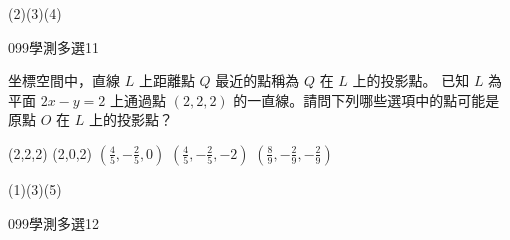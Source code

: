 \begin{QUESTIONS}
\begin{QUESTION}
\begin{QFROMS}
        \end{QFROMS}
        \begin{QTAGS}\end{QTAGS}
        \begin{QANS}
            (2)(3)(4)
        \end{QANS}
        \begin{QSOLLIST}
        \end{QSOLLIST}
        \begin{QEMPTYSPACE}
        \end{QEMPTYSPACE}
    \end{QUESTION}
    \begin{QUESTION}
        \begin{ExamInfo}{099}{學測}{多選}{11}
        \end{ExamInfo}
        \begin{ExamAnsRateInfo}{17}{25}{16}{10}
        \end{ExamAnsRateInfo}
        \begin{QBODY}
			坐標空間中，直線 $L$ 上距離點 $Q$ 最近的點稱為 $Q$ 在 $L$ 上的投影點。 已知 $L$ 為平面 $2x-y=2$ 上通過點 $(2, 2, 2)$ 的一直線。請問下列哪些選項中的點可能是原點 $O$ 在 $L$ 上的投影點？ 
			\begin{QOPS} 
				\QOP (2,2,2) 
				\QOP (2,0,2) 
				\QOP $(\frac{4}{5},-\frac{2}{5},0)$ 
				\QOP $(\frac{4}{5},-\frac{2}{5},-2)$ 
				\QOP $(\frac{8}{9},-\frac{2}{9},-\frac{2}{9})$
			\end{QOPS}
        \end{QBODY}
        \begin{QFROMS}
        \end{QFROMS}
        \begin{QTAGS}\end{QTAGS}
        \begin{QANS}
            (1)(3)(5)
        \end{QANS}
        \begin{QSOLLIST}
        \end{QSOLLIST}
        \begin{QEMPTYSPACE}
        \end{QEMPTYSPACE}
    \end{QUESTION}
    \begin{QUESTION}
        \begin{ExamInfo}{099}{學測}{多選}{12}
        \end{ExamInfo}
        \begin{ExamAnsRateInfo}{21}{37}{16}{10}

\end{ExamAnsRateInfo}
\end{QUESTION}
\end{QUESTIONS}
